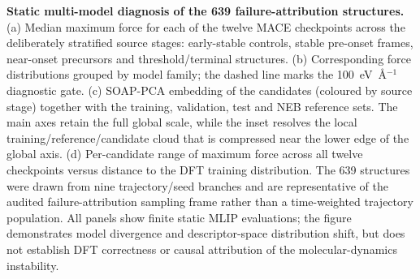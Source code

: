 \caption{\textbf{Static multi-model diagnosis of the 639 failure-attribution structures.} (a) Median maximum force for each of the twelve MACE checkpoints across the deliberately stratified source stages: early-stable controls, stable pre-onset frames, near-onset precursors and threshold/terminal structures. (b) Corresponding force distributions grouped by model family; the dashed line marks the 100~eV~\AA$^{-1}$ diagnostic gate. (c) SOAP-PCA embedding of the candidates (coloured by source stage) together with the training, validation, test and NEB reference sets. The main axes retain the full global scale, while the inset resolves the local training/reference/candidate cloud that is compressed near the lower edge of the global axis. (d) Per-candidate range of maximum force across all twelve checkpoints versus distance to the DFT training distribution. The 639 structures were drawn from nine trajectory/seed branches and are representative of the audited failure-attribution sampling frame rather than a time-weighted trajectory population. All panels show finite static MLIP evaluations; the figure demonstrates model divergence and descriptor-space distribution shift, but does not establish DFT correctness or causal attribution of the molecular-dynamics instability.}\label{fig:multimodel_639_overview}
